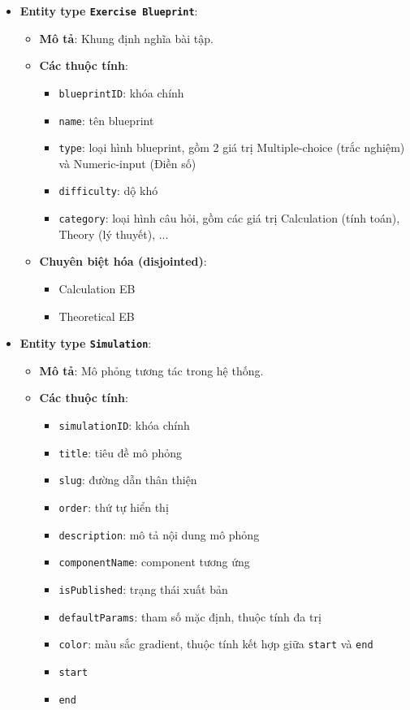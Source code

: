 \begin{itemize}
\item \textbf{Entity type \texttt{Exercise Blueprint}}:
\begin{itemize}
    \item \textbf{Mô tả}: Khung định nghĩa bài tập.
    
    \item \textbf{Các thuộc tính}:
    \begin{itemize}
        \item \texttt{blueprintID}: khóa chính
        \item \texttt{name}: tên blueprint
        \item \texttt{type}: loại hình blueprint, gồm 2 giá trị Multiple-choice (trắc nghiệm) và Numeric-input (Điền số)
        \item \texttt{difficulty}: dộ khó
        \item \texttt{category}: loại hình câu hỏi, gồm các giá trị Calculation (tính toán), Theory (lý thuyết), ...
    \end{itemize}

    \item \textbf{Chuyên biệt hóa (disjointed)}:
    \begin{itemize}
        \item Calculation EB
        \item Theoretical EB
    \end{itemize}
\end{itemize}


\item \textbf{Entity type \texttt{Simulation}}:
\begin{itemize}
    \item \textbf{Mô tả}: Mô phỏng tương tác trong hệ thống.
    
    \item \textbf{Các thuộc tính}:
    \begin{itemize}
        \item \texttt{simulationID}: khóa chính
        \item \texttt{title}: tiêu đề mô phỏng
        \item \texttt{slug}: đường dẫn thân thiện
        \item \texttt{order}: thứ tự hiển thị
        \item \texttt{description}: mô tả nội dung mô phỏng
        \item \texttt{componentName}: component tương ứng
        \item \texttt{isPublished}: trạng thái xuất bản
        \item \texttt{defaultParams}: tham số mặc định, thuộc tính đa trị
        \item \texttt{color}: màu sắc gradient, thuộc tính kết hợp giữa \texttt{start} và \texttt{end}
        \item \texttt{start}
        \item \texttt{end}
    \end{itemize}
\end{itemize}


\end{itemize}
